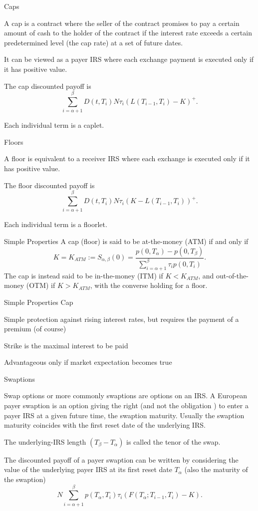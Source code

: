 {Caps}
\item<1->
A cap is a contract where the seller of the contract promises to
pay a certain amount of cash to the holder of the contract if the
interest rate exceeds a certain predetermined level (the cap rate)
at a set of future dates.
\item<2->It can be viewed as a payer IRS where
each exchange payment is executed only if it has positive value.
\item<3->The cap discounted payoff is
$$
\sum_{i=\alpha+1}^{\beta}D(t,T_i)N\tau_i(L(T_{i-1},T_i)-K)^+.
$$
\item<4->Each individual term is a caplet.

{Floors}
\item<1->A floor is
equivalent to a receiver IRS where each exchange is executed only
if it has positive value.
\item<2->
The floor discounted payoff is
$$
\sum_{i=\alpha+1}^{\beta}D(t,T_i)N\tau_i(K-L(T_{i-1},T_i))^+.
$$
\item<3->Each individual term is a floorlet.


{Simple Properties}
A cap
(floor) is said to be at-the-money (ATM) if and only if
$$
K=K_{ATM}:=S_{\alpha,\beta}(0)=\frac{p(0,T_{\alpha})-p(0,T_{\beta})}{\sum_{i=\alpha+1}^{\beta}\tau_ip(0,T_i)}.
$$
The cap is instead said to be in-the-money (ITM) if $K<K_{ATM}$,
and out-of-the-money (OTM) if $K>K_{ATM}$, with the converse
holding for a floor.

{Simple Properties Cap}
\item<1-> Simple protection against rising interest rates, but requires the payment of a premium (of course)
\item<2-> Strike is the maximal interest to be paid
\item<3-> Advantageous only if market expectation becomes true


{Swaptions}
\item<1->Swap options or more commonly swaptions are options on an IRS. A
European payer swaption is an option giving the right (and not the
obligation ) to enter a payer IRS at a given future time, the
swaption maturity. Usually the swaption maturity coincides with
the first reset date of the underlying IRS.
\item<2->
The underlying-IRS
length $(T_{\beta}-T_{\alpha})$ is called the tenor of the swap.
\item<3-> The discounted payoff of a payer swaption can be written by
considering the value of the underlying payer IRS at its first
reset date $T_{\alpha}$ (also the maturity of the swaption)
$$
N\sum_{i=\alpha+1}^{\beta} p(T_{\alpha},T_i)\tau_i(F(T_{\alpha};T_{i-1},T_i)-K).
$$

